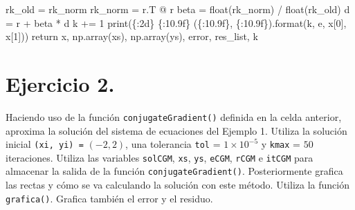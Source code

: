 \documentclass[
  letterpaper,
  DIV=11,
  numbers=noendperiod]{scrreprt}
\newenvironment{Shaded}{\begin{snugshade}}{\end{snugshade}}
\newcommand{\BuiltInTok}[1]{\textcolor[rgb]{0.00,0.23,0.31}{#1}}
\newcommand{\ControlFlowTok}[1]{\textcolor[rgb]{0.00,0.23,0.31}{#1}}
\newcommand{\DecValTok}[1]{\textcolor[rgb]{0.68,0.00,0.00}{#1}}
\newcommand{\NormalTok}[1]{\textcolor[rgb]{0.00,0.23,0.31}{#1}}
\newcommand{\OperatorTok}[1]{\textcolor[rgb]{0.37,0.37,0.37}{#1}}
\newcommand{\SpecialCharTok}[1]{\textcolor[rgb]{0.37,0.37,0.37}{#1}}
\newcommand{\StringTok}[1]{\textcolor[rgb]{0.13,0.47,0.30}{#1}}
\begin{document}
\begin{Shaded}
\begin{Highlighting}[]
\NormalTok{        rk\_old }\OperatorTok{=}\NormalTok{ rk\_norm}
\NormalTok{        rk\_norm }\OperatorTok{=}\NormalTok{ r.T }\OperatorTok{@}\NormalTok{ r}
\NormalTok{        beta }\OperatorTok{=} \BuiltInTok{float}\NormalTok{(rk\_norm) }\OperatorTok{/} \BuiltInTok{float}\NormalTok{(rk\_old)}
\NormalTok{        d }\OperatorTok{=}\NormalTok{ r }\OperatorTok{+}\NormalTok{ beta }\OperatorTok{*}\NormalTok{ d}
\NormalTok{        k }\OperatorTok{+=} \DecValTok{1}
        \BuiltInTok{print}\NormalTok{(}\StringTok{\textquotesingle{}}\SpecialCharTok{\{:2d\}}\StringTok{ }\SpecialCharTok{\{:10.9f\}}\StringTok{ (}\SpecialCharTok{\{:10.9f\}}\StringTok{, }\SpecialCharTok{\{:10.9f\}}\StringTok{)\textquotesingle{}}\NormalTok{.}\BuiltInTok{format}\NormalTok{(k, e, x[}\DecValTok{0}\NormalTok{], x[}\DecValTok{1}\NormalTok{]))}
    \ControlFlowTok{return}\NormalTok{ x, np.array(xs), np.array(ys), error, res\_list, k}
\end{Highlighting}
\end{Shaded}

\section{\texorpdfstring{\textbf{Ejercicio
2.}}{Ejercicio 2.}}\label{ejercicio-2.-1}

Haciendo uso de la función \texttt{conjugateGradient()} definida en la
celda anterior, aproxima la solución del sistema de ecuaciones del
Ejemplo 1. Utiliza la solución inicial \texttt{(xi,\ yi)\ =}
\((-2, 2)\), una tolerancia \texttt{tol} = \(1 \times 10^{-5}\) y
\texttt{kmax} = \(50\) iteraciones. Utiliza las variables
\texttt{solCGM}, \texttt{xs}, \texttt{ys}, \texttt{eCGM}, \texttt{rCGM}
e \texttt{itCGM} para almacenar la salida de la función
\texttt{conjugateGradient()}. Posteriormente grafica las rectas y cómo
se va calculando la solución con este método. Utiliza la función
\texttt{grafica()}. Grafica también el error y el residuo.
\end{document}
